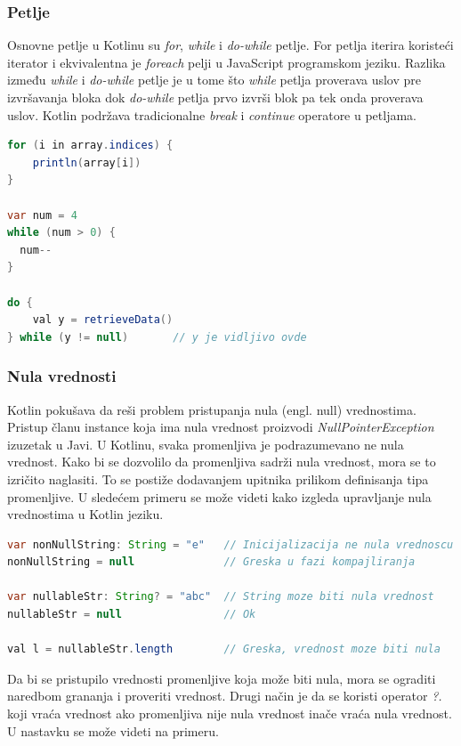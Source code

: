 \documentclass[12pt,oneside]{memoir}
\begin{document}
 
\subsubsection{Petlje}
Osnovne petlje u Kotlinu su \emph{for}, \emph{while} i \emph{do-while} petlje. For petlja iterira koristeći iterator i ekvivalentna je \emph{foreach} pelji u JavaScript programskom jeziku. Razlika između \emph{while} i \emph{do-while} petlje je u tome što \emph{while} petlja proverava uslov pre izvršavanja bloka dok \emph{do-while} petlja prvo izvrši blok pa tek onda proverava uslov. Kotlin podržava tradicionalne \emph{break} i \emph{continue} operatore u petljama.

\begin{lstlisting}[caption={Petlje u Kotlin jeziku},captionpos=t, language=Java]
for (i in array.indices) {
    println(array[i])
}
 
var num = 4 
while (num > 0) {
  num--
}
 
do {
    val y = retrieveData()
} while (y != null)       // y je vidljivo ovde 
\end{lstlisting}
 
\subsubsection{Nula vrednosti}
Kotlin pokušava da reši problem pristupanja nula (engl. null) vrednostima. Pristup članu instance koja ima nula vrednost proizvodi \emph{NullPointerException} izuzetak u Javi. U Kotlinu, svaka promenljiva je podrazumevano ne nula vrednost. Kako bi se dozvolilo da promenljiva sadrži nula vrednost, mora se to izričito naglasiti. To se postiže dodavanjem upitnika prilikom definisanja tipa promenljive. U sledećem primeru se može videti kako izgleda upravljanje nula vrednostima u Kotlin jeziku.

\begin{lstlisting}[caption={Dodela nula vrednosti},captionpos=t, language=Java]
var nonNullString: String = "e"   // Inicijalizacija ne nula vrednoscu
nonNullString = null              // Greska u fazi kompajliranja
 
var nullableStr: String? = "abc"  // String moze biti nula vrednost
nullableStr = null                // Ok
 
val l = nullableStr.length        // Greska, vrednost moze biti nula
\end{lstlisting}
 
Da bi se pristupilo vrednosti promenljive koja može biti nula, mora se ograditi naredbom grananja i proveriti vrednost. Drugi način je da se koristi operator \emph{?.} koji vraća vrednost ako promenljiva nije nula vrednost inače vraća nula vrednost. U nastavku se može videti na primeru.
 
\end{document}
